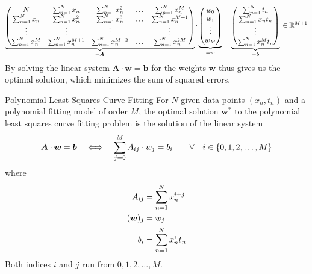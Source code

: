 \documentclass[11pt,DINA4, fleqn]{amsart}
\def\vw{\boldsymbol{w}\xspace}
\def\vb{\boldsymbol{b}\xspace}
\def\mA{\boldsymbol{A}\xspace}
\begin{document}
\begin{align}
\underbrace{
\begin{pmatrix}
N & \sum\displaylimits_{n = 1}^{N}x_n & \sum\displaylimits_{n = 1}^{N}x_n^2 & \dots & \sum\displaylimits_{n = 1}^{N}x_n^M \\
\sum\displaylimits_{n = 1}^{N}x_n & \sum\displaylimits_{n = 1}^{N}x_n^2 &
\sum\displaylimits_{n = 1}^{N}x_n^3 & \dots &
\sum\displaylimits_{n = 1}^{N}x_n^{M + 1} \\
\vdots & \vdots & \vdots && \vdots \\ 
\sum\displaylimits_{n = 1}^{N}x_n^M &
\sum\displaylimits_{n = 1}^{N}x_n^{M+1} &
\sum\displaylimits_{n = 1}^{N}x_n^{M+2} &
\dotsc &  \sum\displaylimits_{n = 1}^{N}x_n^{2M}
\end{pmatrix}}_{=\mA} \cdot
\underbrace{\begin{pmatrix}
w_0 \\ w_1 \\ \vdots \\ w_M
\end{pmatrix}}_{=\vw}
=
\underbrace{\begin{pmatrix}
\sum\displaylimits_{n = 1}^{N} t_n \\
\sum\displaylimits_{n = 1}^{N} x_n t_n \\
\vdots \\
\sum\displaylimits_{n = 1}^{N} x_n^M t_n 
\end{pmatrix}}_{=\vb} \, \in \mathbb{R}^{M+1}
\end{align}
By solving the linear system $\mA \cdot \vw = \vb$ for the weights $\vw$ thus gives us the optimal solution, which minimizes the sum of squared errors.

\begin{mybox_tc3}{Polynomial Least Squares Curve Fitting}
	For $N$ given data points $(x_n, t_n)$ and a polynomial fitting model of order $M$,
	the optimal solution $\vw^*$ to the polynomial least squares curve fitting problem is the solution of the linear system
	\begin{align}
	\mA \cdot \vw = \vb \quad \Longleftrightarrow \quad \sum \displaylimits_{j = 0}^{M} A_{ij} \cdot w_j = b_i  \qquad \forall\quad i \in \{0, 1, 2, \dotsc, M\}
	\end{align}
	where
	\begin{align}
	A_{ij} &= \sum \displaylimits_{n = 1}^{N} x_n^{i + j} \\
	(\vw)_j &= w_j \\
	b_i &= \sum \displaylimits_{n = 1}^{N} x_n^{i} t_n
	\end{align}
	Both indices $i$ and $j$ run from $0, 1, 2, \dotsc, M$.
\end{mybox_tc3}
\end{document}
